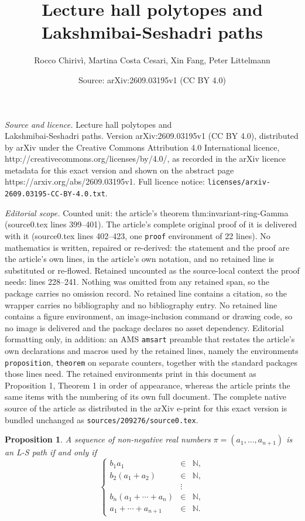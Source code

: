\documentclass[10pt,a4paper]{amsart}
\title{Lecture hall polytopes and\\Lakshmibai-Seshadri paths}
\author{Rocco Chiriv\`i, Martina Costa Cesari, Xin Fang, Peter Littelmann}
\date{Source: arXiv:2609.03195v1 (CC BY 4.0)}
\newtheorem{proposition}{Proposition}
\newcommand{\NN}{\mathbb{N}}
\begin{document}
\maketitle

\noindent\emph{Source and licence.} Lecture hall polytopes and\\Lakshmibai-Seshadri paths. Version arXiv:2609.03195v1 (CC BY 4.0), distributed by arXiv under the Creative Commons Attribution 4.0 International licence, http://creativecommons.org/licenses/by/4.0/, as recorded in the arXiv licence metadata for this exact version and shown on the abstract page https://arxiv.org/abs/2609.03195v1. Full licence notice: \texttt{licenses/arxiv-2609.03195-CC-BY-4.0.txt}.\par\smallskip

\noindent\textit{Editorial scope.} Counted unit: the article's theorem thm:invariant-ring-Gamma (source0.tex lines 399--401). The article's complete original proof of it is delivered with it (source0.tex lines 402--423, one \texttt{proof} environment of 22 lines). No mathematics is written, repaired or re-derived: the statement and the proof are the article's own lines, in the article's own notation, and no retained line is substituted or re-flowed.  Retained uncounted as the source-local context the proof needs: lines 228--241.  Nothing was omitted from any retained span, so the package carries no omission record.  No retained line contains a citation, so the wrapper carries no bibliography and no bibliography entry.  No retained line contains a figure environment, an image-inclusion command or drawing code, so no image is delivered and the package declares no asset dependency.  Editorial formatting only, in addition: an AMS \texttt{amsart} preamble that restates the article's own declarations and macros used by the retained lines, namely the environments \texttt{proposition}, \texttt{theorem} on separate counters, together with the standard packages those lines need.  The retained environments print in this document as Proposition 1, Theorem 1 in order of appearance, whereas the article prints the same items with the numbering of its own full document.  The complete native source of the article as distributed in the arXiv e-print for this exact version is bundled unchanged as \texttt{sources/209276/source0.tex}.
\begin{proposition}\label{prop:LS-characterization}
    A sequence of non-negative real numbers $\pi = (a_1,\dots,a_{n+1})$ is an L-S path if and only if
    \[
    \left\{
    \begin{array}{rcl}
        b_1 a_1 & \in &  \NN,\\
        b_2(a_1 + a_2) & \in &  \NN,\\
        & \vdots\\
        b_n(a_1 + \cdots + a_n) & \in &  \NN,\\
        a_1 + \cdots + a_{n+1} & \in &  \NN.
    \end{array}
    \right.
    \]
\end{proposition}
\end{document}
